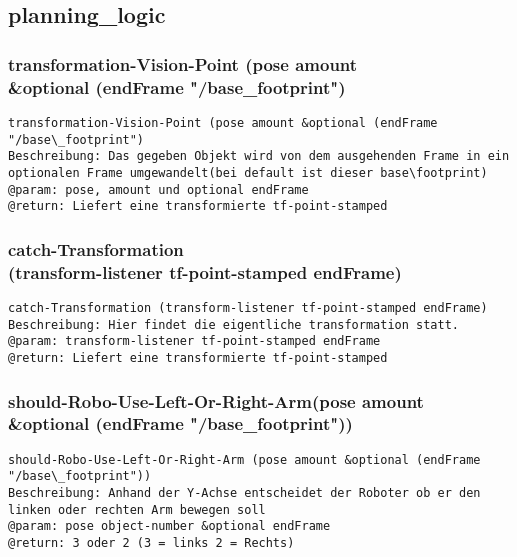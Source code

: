 \documentclass{suturo}
\begin{document}
\subsection{planning\_logic}

\subsubsection{transformation-Vision-Point (pose amount\\
\&optional (endFrame "/base\_footprint")}
\begin{verbatim}
transformation-Vision-Point (pose amount &optional (endFrame "/base\_footprint")
Beschreibung: Das gegeben Objekt wird von dem ausgehenden Frame in ein optionalen Frame umgewandelt(bei default ist dieser base\footprint)
@param: pose, amount und optional endFrame
@return: Liefert eine transformierte tf-point-stamped
\end{verbatim}




\subsubsection{catch-Transformation \\
(transform-listener tf-point-stamped endFrame)}
\begin{verbatim}
catch-Transformation (transform-listener tf-point-stamped endFrame)
Beschreibung: Hier findet die eigentliche transformation statt.
@param: transform-listener tf-point-stamped endFrame
@return: Liefert eine transformierte tf-point-stamped
\end{verbatim}




\subsubsection{should-Robo-Use-Left-Or-Right-Arm(pose amount \\
\&optional (endFrame "/base\_footprint"))}
\begin{verbatim}
should-Robo-Use-Left-Or-Right-Arm (pose amount &optional (endFrame "/base\_footprint"))
Beschreibung: Anhand der Y-Achse entscheidet der Roboter ob er den linken oder rechten Arm bewegen soll
@param: pose object-number &optional endFrame
@return: 3 oder 2 (3 = links 2 = Rechts)
\end{verbatim}
\end{document}
